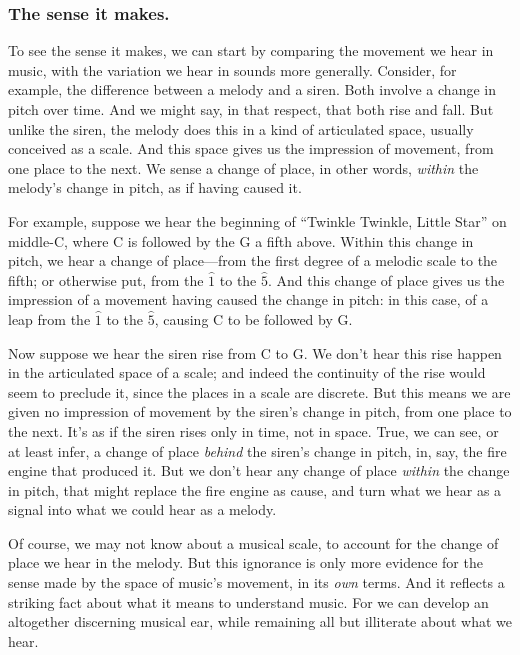 \documentclass[12pt]{memoir}
\begin{document}
\subsubsection{The sense it makes.}

To see the sense it makes, we can start by comparing the movement we
hear in music, with the variation we hear in sounds more generally.
Consider, for example, the difference between a melody and a siren. Both
involve a change in pitch over time. And we might say, in that respect,
that both rise and fall. But unlike the siren, the melody does this in a
kind of articulated space, usually conceived as a scale. And this space
gives us the impression of movement, from one place to the next. We
sense a change of place, in other words, \emph{within} the melody's
change in pitch, as if having caused it.

For example, suppose we hear the beginning of ``Twinkle Twinkle, Little
Star'' on middle-C, where C is followed by the G a fifth above. Within
this change in pitch, we hear a change of place---from the first degree
of a melodic scale to the fifth; or otherwise put, from the $\hat{1}$ to
the $\hat{5}$. And this change of place gives us the impression of a
movement having caused the change in pitch: in this case, of a leap from
the $\hat{1}$ to the $\hat{5}$, causing C to be followed by G.

Now suppose we hear the siren rise from C to G. We don't hear this rise
happen in the articulated space of a scale; and indeed the continuity of
the rise would seem to preclude it, since the places in a scale are
discrete. But this means we are given no impression of movement by the
siren's change in pitch, from one place to the next. It's as if the
siren rises only in time, not in space. True, we can see, or at least
infer, a change of place \emph{behind} the siren's change in pitch, in,
say, the fire engine that produced it. But we don't hear any change of
place \emph{within} the change in pitch, that might replace the fire
engine as cause, and turn what we hear as a signal into what we could
hear as a melody.

Of course, we may not know about a musical scale, to account for the
change of place we hear in the melody. But this ignorance is only more
evidence for the sense made by the space of music's movement, in its
\emph{own} terms. And it reflects a striking fact about what it means to
understand music. For we can develop an altogether discerning musical
ear, while remaining all but illiterate about what we hear.
\end{document}
